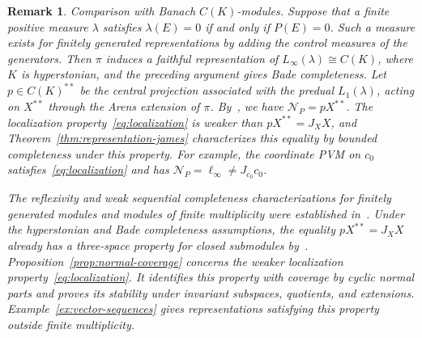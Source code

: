 \documentclass[11pt,leqno]{amsart}
\theoremstyle{compact}
\numberwithin{equation}{section}
\theoremstyle{compactremark}
\newtheorem{remark}[theorem]{Remark}
\theoremstyle{compact}
\newcommand{\1}{\mathbbm{1}}
\begin{document}
\begin{remark}
\emph{Comparison with Banach $C(K)$-modules.} Suppose that a finite positive measure $\lambda$ satisfies $\lambda(E)=0$ if and only if $P(E)=0$. Such a measure exists for finitely generated representations by adding the control measures of the generators. Then $\pi$ induces a faithful representation of $L_\infty(\lambda)\cong C(K)$, where $K$ is hyperstonian, and the preceding argument gives Bade completeness. Let $p\in C(K)^{**}$ be the central projection associated with the predual $L_1(\lambda)$, acting on $X^{**}$ through the Arens extension of $\pi$. By~\cite[Lemma~2.13(3)]{KitoverOrhon2017}, we have $\mathcal N_P=pX^{**}$. The localization property~\eqref{eq:localization} is weaker than $pX^{**}=J_XX$, and Theorem~\ref{thm:representation-james} characterizes this equality by bounded completeness under this property. For example, the coordinate PVM on $c_0$ satisfies~\eqref{eq:localization} and has $\mathcal N_P=\ell_\infty\neq J_{c_0}c_0$.

The reflexivity and weak sequential completeness characterizations for finitely generated modules and modules of finite multiplicity were established in~\cite{KitoverOrhon2014,KitoverOrhon2017}. Under the hyperstonian and Bade completeness assumptions, the equality $pX^{**}=J_XX$ already has a three-space property for closed submodules by~\cite[Lemma~2.16]{KitoverOrhon2017}. Proposition~\ref{prop:normal-coverage} concerns the weaker localization property~\eqref{eq:localization}. It identifies this property with coverage by cyclic normal parts and proves its stability under invariant subspaces, quotients, and extensions. Example~\ref{ex:vector-sequences} gives representations satisfying this property outside finite multiplicity.
\end{remark}
\end{document}
